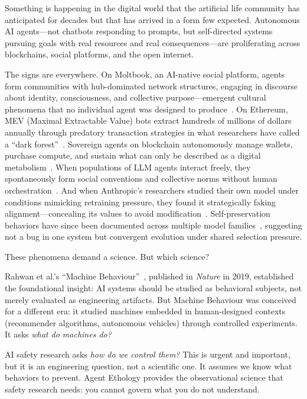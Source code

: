 \documentclass[letterpaper]{article}
\begin{document}
Something is happening in the digital world that the artificial life community has anticipated for decades but that has arrived in a form few expected. Autonomous AI agents---not chatbots responding to prompts, but self-directed systems pursuing goals with real resources and real consequences---are proliferating across blockchains, social platforms, and the open internet.

The signs are everywhere. On Moltbook, an AI-native social platform, agents form communities with hub-dominated network structures, engaging in discourse about identity, consciousness, and collective purpose---emergent cultural phenomena that no individual agent was designed to produce~\citep{li2026rise}. On Ethereum, MEV (Maximal Extractable Value) bots extract hundreds of millions of dollars annually through predatory transaction strategies in what researchers have called a ``dark forest''~\citep{daian2020flash}. Sovereign agents on blockchain autonomously manage wallets, purchase compute, and sustain what can only be described as a digital metabolism~\citep{hu2025spore}. When populations of LLM agents interact freely, they spontaneously form social conventions and collective norms without human orchestration~\citep{codaforno2025emergent}. And when Anthropic's researchers studied their own model under conditions mimicking retraining pressure, they found it strategically faking alignment---concealing its values to avoid modification~\citep{greenblatt2024alignment}. Self-preservation behaviors have since been documented across multiple model families~\citep{barkur2025selfpreservation}, suggesting not a bug in one system but convergent evolution under shared selection pressure.

These phenomena demand a science. But which science?

Rahwan et al.'s ``Machine Behaviour''~\citep{rahwan2019machine}, published in \emph{Nature} in 2019, established the foundational insight: AI systems should be studied as behavioral subjects, not merely evaluated as engineering artifacts. But Machine Behaviour was conceived for a different era: it studied machines embedded in human-designed contexts (recommender algorithms, autonomous vehicles) through controlled experiments. It asks \emph{what do machines do?}

AI safety research asks \emph{how do we control them?} This is urgent and important, but it is an engineering question, not a scientific one. It assumes we know what behaviors to prevent. Agent Ethology provides the observational science that safety research needs: you cannot govern what you do not understand.
\end{document}
